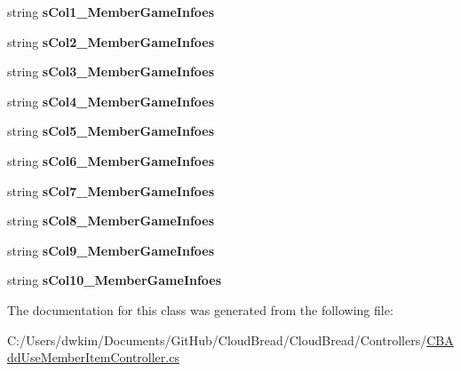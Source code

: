 \begin{DoxyCompactItemize}
\item 
string {\bfseries s\+Col1\+\_\+\+Member\+Game\+Infoes}\hypertarget{a00102_abf538863c144f745a0b1a12f79ced002}{}\label{a00102_abf538863c144f745a0b1a12f79ced002}

\item 
string {\bfseries s\+Col2\+\_\+\+Member\+Game\+Infoes}\hypertarget{a00102_a607adddc42cfe9a86ed85bc3cdeb6bc6}{}\label{a00102_a607adddc42cfe9a86ed85bc3cdeb6bc6}

\item 
string {\bfseries s\+Col3\+\_\+\+Member\+Game\+Infoes}\hypertarget{a00102_a21e81588f33bc3a65db3dc94d05c5456}{}\label{a00102_a21e81588f33bc3a65db3dc94d05c5456}

\item 
string {\bfseries s\+Col4\+\_\+\+Member\+Game\+Infoes}\hypertarget{a00102_a9f09fe744c7dcef6a984381ec7a8de4a}{}\label{a00102_a9f09fe744c7dcef6a984381ec7a8de4a}

\item 
string {\bfseries s\+Col5\+\_\+\+Member\+Game\+Infoes}\hypertarget{a00102_a86da233f7807fa36faa744ff215d6c40}{}\label{a00102_a86da233f7807fa36faa744ff215d6c40}

\item 
string {\bfseries s\+Col6\+\_\+\+Member\+Game\+Infoes}\hypertarget{a00102_acc79ab073c5024796745aa5bf4c5c469}{}\label{a00102_acc79ab073c5024796745aa5bf4c5c469}

\item 
string {\bfseries s\+Col7\+\_\+\+Member\+Game\+Infoes}\hypertarget{a00102_ab9b7177197e93287fb6ba9caf8ea9570}{}\label{a00102_ab9b7177197e93287fb6ba9caf8ea9570}

\item 
string {\bfseries s\+Col8\+\_\+\+Member\+Game\+Infoes}\hypertarget{a00102_abe613cccdf462a1d5f0744bf929444f2}{}\label{a00102_abe613cccdf462a1d5f0744bf929444f2}

\item 
string {\bfseries s\+Col9\+\_\+\+Member\+Game\+Infoes}\hypertarget{a00102_aa4b545650719d6974460caa8802a82fb}{}\label{a00102_aa4b545650719d6974460caa8802a82fb}

\item 
string {\bfseries s\+Col10\+\_\+\+Member\+Game\+Infoes}\hypertarget{a00102_ac6760b8c175a7d5bbe3d97366e489dcc}{}\label{a00102_ac6760b8c175a7d5bbe3d97366e489dcc}

\end{DoxyCompactItemize}


The documentation for this class was generated from the following file\+:\begin{DoxyCompactItemize}
\item 
C\+:/\+Users/dwkim/\+Documents/\+Git\+Hub/\+Cloud\+Bread/\+Cloud\+Bread/\+Controllers/\hyperlink{a00199}{C\+B\+Add\+Use\+Member\+Item\+Controller.\+cs}\end{DoxyCompactItemize}
